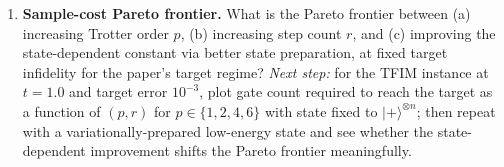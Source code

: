 \begin{enumerate}
  \item \textbf{Sample-cost Pareto frontier.}
  What is the Pareto frontier between (a) increasing Trotter order $p$, (b) increasing
  step count $r$, and (c) improving the state-dependent constant via better state preparation,
  at fixed target infidelity for the paper's target regime?
  \emph{Next step:} for the TFIM instance at $t=1.0$ and target error $10^{-3}$,
  plot gate count required to reach the target as a function of $(p,r)$ for
  $p \in \{1,2,4,6\}$ with state fixed to $|+\rangle^{\otimes n}$; then repeat with a
  variationally-prepared low-energy state and see whether the state-dependent improvement
  shifts the Pareto frontier meaningfully.
\end{enumerate}
